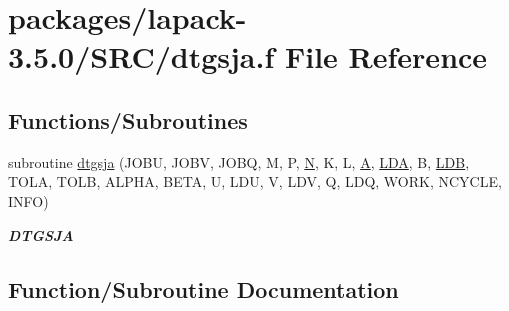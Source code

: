 \hypertarget{dtgsja_8f}{}\section{packages/lapack-\/3.5.0/\+S\+R\+C/dtgsja.f File Reference}
\label{dtgsja_8f}
\subsection*{Functions/\+Subroutines}
\begin{DoxyCompactItemize}
\item 
subroutine \hyperlink{dtgsja_8f_a735d79ef7de07a8458981915eaa0aae8}{dtgsja} (J\+O\+B\+U, J\+O\+B\+V, J\+O\+B\+Q, M, P, \hyperlink{polmisc_8c_a0240ac851181b84ac374872dc5434ee4}{N}, K, L, \hyperlink{classA}{A}, \hyperlink{example__user_8c_ae946da542ce0db94dced19b2ecefd1aa}{L\+D\+A}, B, \hyperlink{example__user_8c_a50e90a7104df172b5a89a06c47fcca04}{L\+D\+B}, T\+O\+L\+A, T\+O\+L\+B, A\+L\+P\+H\+A, B\+E\+T\+A, U, L\+D\+U, V, L\+D\+V, Q, L\+D\+Q, W\+O\+R\+K, N\+C\+Y\+C\+L\+E, I\+N\+F\+O)
\begin{DoxyCompactList}\small\item\em {\bfseries D\+T\+G\+S\+J\+A} \end{DoxyCompactList}\end{DoxyCompactItemize}


\subsection{Function/\+Subroutine Documentation}
\hypertarget{dtgsja_8f_a735d79ef7de07a8458981915eaa0aae8}{}
